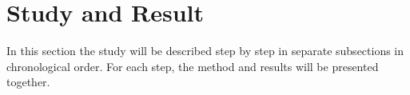 

\section{Study and Result}

In this section the study will be described step by step in separate subsections in chronological order.
For each step, the method and results will be presented together.








